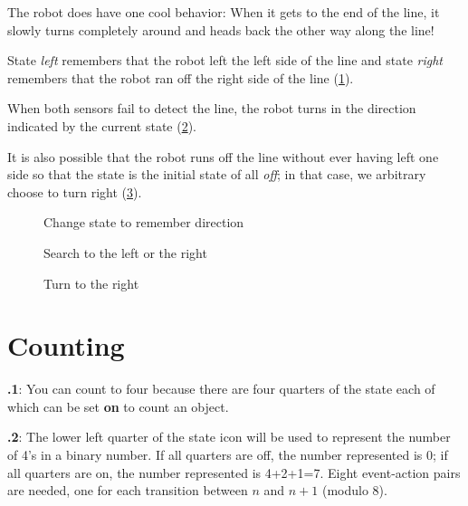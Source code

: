 \documentclass[11pt,a4paper,english]{article}
\begin{document}
The robot does have one cool behavior: When it gets to the end of the
line, it slowly turns completely around and heads back the other way
along the line!

State \emph{left}  remembers that the robot left the
left side of the line and state \emph{right} 
remembers that the robot ran off the right side of the line
(\cref{fig.follow3}).

When both sensors fail to detect the line, the robot turns in the
direction indicated by the current state (\cref{fig.follow1}).

It is also possible that the robot runs off the line without ever having
left one side so that the state is the initial state of all \emph{off};
in that case, we arbitrary choose to turn right (\cref{fig.follow2}).

\begin{figure}
\begin{center}
\caption{Change state to remember direction}\label{fig.follow3}
\end{center}
\end{figure}

\begin{figure}
\begin{center}
\caption{Search to the left or the right}\label{fig.follow1}
\end{center}
\end{figure}

\begin{figure}
\begin{center}
\caption{Turn to the right}\label{fig.follow2}
\end{center}
\end{figure}



\section{Counting}

\textbf{\thesection.1}:
You can count to four because there are four quarters of the state
each of which can be set \textbf{on} to count an object.

\textbf{\thesection.2}:
The lower left quarter of the state icon will be used to represent the
number of 4's in a binary number. If all quarters are off, the number represented
is 0; if all quarters are on, the number represented is 4+2+1=7.
Eight event-action pairs are needed, one for each transition between $n$ and
$n+1$ (modulo 8).
\end{document}
